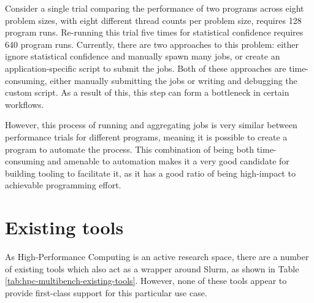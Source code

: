 Consider a single trial comparing the performance of two programs across eight problem sizes, with eight different thread counts per problem size, requires 128 program runs. Re-running this trial five times for statistical confidence requires 640 program runs. Currently, there are two approaches to this problem: either ignore statistical confidence and manually spawn many jobs, or create an application-specific script to submit the jobs. Both of these approaches are time-consuming, either manually submitting the jobs or writing and debugging the custom script. As a result of this, this step can form a bottleneck in certain workflows.

However, this process of running and aggregating jobs is very similar between performance trials for different programs, meaning it is possible to create a program to automate the process. This combination of being both time-consuming and amenable to automation makes it a very good candidate for building tooling to facilitate it, as it has a good ratio of being high-impact to achievable programming effort.

\section{Existing tools}
\label{sec:hpc-multibench-existing-tools}

As High-Performance Computing is an active research space, there are a number of existing tools which also act as a wrapper around Slurm, as shown in Table \ref{tab:hpc-multibench-existing-tools}. However, none of these tools appear to provide first-class support for this particular use case.

